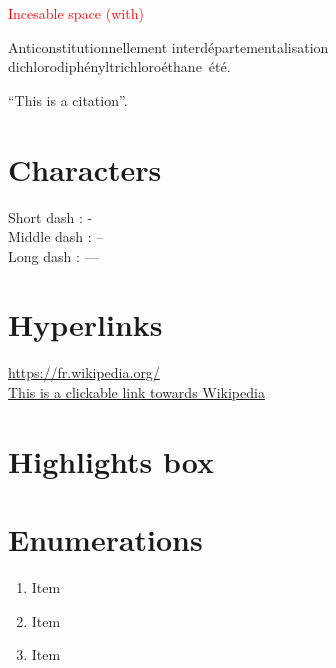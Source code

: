 \medbreak

\textcolor{red}{Incesable space (with)}

Anticonstitutionnellement interdépartementalisation dichlorodiphényltrichloroéthane~été.

\newpage

``This is a citation''.

\newpage


\section{Characters}
Short dash : - \\
Middle dash : -- \\
Long dash : --- \\

\newpage


\section{Hyperlinks}
\url{https://fr.wikipedia.org/} \\
\href{https://fr.wikipedia.org/}{This is a clickable link towards Wikipedia}

\newpage



\section{Highlights box}

\newpage


\section{Enumerations}

\begin{enumerate}[label=\Alph*.]
    \item Item \label{item:item_A}
    \item Item
    \item Item
\end{enumerate}
\bigbreak

